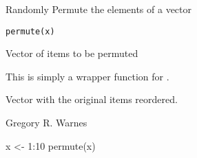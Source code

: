 \begin{Description}\relax
Randomly Permute the elements of a vector
\end{Description}
\begin{Usage}
\begin{verbatim}
permute(x)
\end{verbatim}
\end{Usage}
\begin{Arguments}
\begin{ldescription}
\item[\code{x}] Vector of items to be permuted 
\end{ldescription}
\end{Arguments}
\begin{Details}\relax
This is simply a wrapper function for .
\end{Details}
\begin{Value}
Vector with the original items reordered.
\end{Value}
\begin{Author}\relax
Gregory R. Warnes 
\end{Author}
\begin{SeeAlso}\relax
{}
\end{SeeAlso}
\begin{Examples}
\begin{ExampleCode}
  x <- 1:10
  permute(x)
\end{ExampleCode}
\end{Examples}

